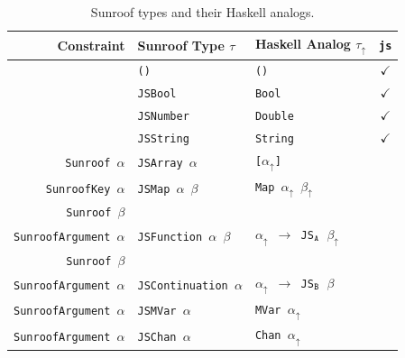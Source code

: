 \documentclass{llncs}
\newcommand{\HaskellAnalog}[1]{#1\ensuremath{_\uparrow}}
\newcommand{\Src}[1]{{\tt{#1}}}
\begin{document}
\begin{table}[t]
\begin{center}
\begin{tabular}{r@{\quad}l@{\quad}l@{\quad}c}
\hline\rule{0pt}{12pt}%
  Constraint
  & Sunroof Type $\tau$
  & Haskell Analog \HaskellAnalog{$\tau$}
  & \Src{js} \\ \hline\rule{0pt}{12pt}%
  
  & \Src{()}       & \Src{()}     & $\checkmark$ \\
  & \Src{JSBool}   & \Src{Bool}   & $\checkmark$ \\
  & \Src{JSNumber} & \Src{Double} & $\checkmark$ \\
  & \Src{JSString} & \Src{String} & $\checkmark$ \\
  
  \Src{Sunroof $\alpha$}
  & \Src{JSArray $\alpha$} 
  & \Src{[$\HaskellAnalog{\alpha}$]}
  & \\
  
  \Src{SunroofKey $\alpha$}
  & \Src{JSMap $\alpha$ $\beta$}
  & \Src{Map $\HaskellAnalog{\alpha}$ $\HaskellAnalog{\beta}$}
  & \\
  \Src{Sunroof $\beta$} \\
  
  \Src{SunroofArgument $\alpha$}
  & \Src{JSFunction $\alpha$ $\beta$ }
  & \Src{$\HaskellAnalog{\alpha}$ $\rightarrow$ JS$_\Src{A}$ $\HaskellAnalog{\beta}$} 
  & \\
  \Src{Sunroof $\beta$} \\

  \Src{SunroofArgument $\alpha$}
  & \Src{JSContinuation $\alpha$}
  & \Src{$\HaskellAnalog{\alpha}$ $\rightarrow$ JS$_\Src{B}$ $\beta$} 
  & \\
  
  \Src{SunroofArgument $\alpha$}
  & \Src{JSMVar $\alpha$}
  & \Src{MVar $\HaskellAnalog{\alpha}$}
  & \\
  
  \Src{SunroofArgument $\alpha$}
  & \Src{JSChan $\alpha$}
  & \Src{Chan $\HaskellAnalog{\alpha}$}
  & \\[2pt]
\hline
\end{tabular}
\end{center}
\caption{Sunroof types and their Haskell analogs.}
\label{tab:sunroof-types}
\end{table} 
\end{document}
